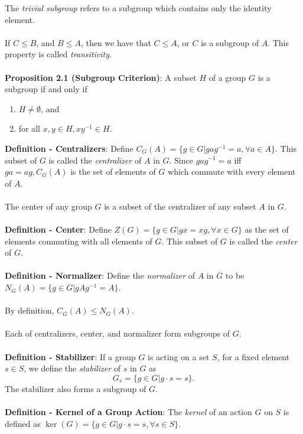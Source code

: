 \documentclass{article}
\begin{document}
The \textit{trivial subgroup} refers to a subgroup which contains only the identity element. \\ \\
If $C \leq B$, and $B \leq A$, then we have that $C \leq A$, or $C$ is a subgroup of $A$. This property is called \textit{transitivity}. \\ \\
\textbf{Proposition 2.1 (Subgroup Criterion)}: A subset $H$ of a group $G$ is a subgroup if and only if \begin{enumerate}
    \item $H \neq \emptyset$, and
    \item for all $x, y \in H, xy^{-1} \in H$.
\end{enumerate} $ $ \\
\textbf{Definition - Centralizers}: Define $C_G(A) = \{g \in G| gag^{-1} = a, \forall a \in A\}$. This subset of $G$ is called the \textit{centralizer} of $A$ in $G$. Since $gag^{-1} = a$ iff $ga = ag, C_G(A)$ is the set of elements of $G$ which commute with every element of $A$. \\ \\
The center of any group $G$ is a subset of the centralizer of any subset $A$ in $G$. \\ \\
\textbf{Definition - Center}: Define $Z(G) = \{g \in G | gx = xg, \forall x \in G\}$ as the set of elements commuting with all elements of $G$. This subset of $G$ is called the \textit{center} of $G$. \\ \\
\textbf{Definition - Normalizer}: Define the \textit{normalizer} of $A$ in $G$ to be $N_G(A) = \{g \in G | gAg^{-1} = A\}$. \\ \\
By definition, $C_G(A) \leq N_G(A)$. \\ \\
Each of centralizers, center, and normalizer form subgroups of $G$. \\ \\
\textbf{Definition - Stabilizer}: If a group $G$ is acting on a set $S$, for a fixed element $s \in S$, we define the \textit{stabilizer} of $s$ in $G$ as $$G_s = \{g \in G | g \cdot s = s\}.$$ The stabilizer also forms a subgroup of $G$. \\ \\
\textbf{Definition - Kernel of a Group Action}: The \textit{kernel} of an action $G$ on $S$ is defined as $\ker(G) = \{g \in G| g \cdot s = s, \forall s \in S\}$. \\ \\
\end{document}
